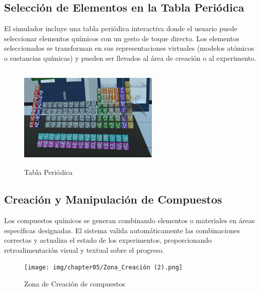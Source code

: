 \subsection{Selección de Elementos en la Tabla Periódica}
El simulador incluye una tabla periódica interactiva donde el usuario puede seleccionar elementos químicos con un gesto de toque directo. Los elementos seleccionados se transforman en sus representaciones virtuales (modelos atómicos o sustancias químicas) y pueden ser llevados al área de creación o al experimento.
\begin{figure}[thbp]
    \centering
    \includegraphics[width=0.6\textwidth, height = 5cm]{img/chapter05/Tabla_Periodica.png}
    \caption{Tabla Periódica}
    \label{fig:Tabla_Periódica}
\end{figure}
\subsection{Creación y Manipulación de Compuestos}
Los compuestos químicos se generan combinando elementos o materiales en áreas específicas designadas. El sistema valida automáticamente las combinaciones correctas y actualiza el estado de los experimentos, proporcionando retroalimentación visual y textual sobre el progreso.
\begin{figure}[thbp]
    \centering
    \texttt{[image: img/chapter05/Zona\_Creación (2).png]}
    \caption{Zona de Creación de compuestos}
    \label{fig:Creación_Compuestos}
\end{figure}
\newpage
